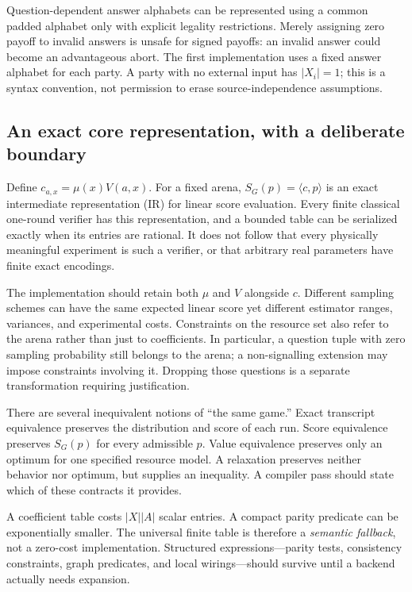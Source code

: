Question-dependent answer alphabets can be represented using a common padded
alphabet only with explicit legality restrictions. Merely assigning zero payoff
to invalid answers is unsafe for signed payoffs: an invalid answer could become
an advantageous abort. The first implementation uses a fixed answer alphabet
for each party. A party with no external input has $|X_i|=1$; this is a syntax
convention, not permission to erase source-independence assumptions.

\subsection{An exact core representation, with a deliberate boundary}
Define $c_{a,x}=\mu(x)V(a,x)$. For a fixed arena,
$S_G(p)=\langle c,p\rangle$ is an exact intermediate representation (IR) for
linear score evaluation. Every finite classical one-round verifier has this
representation, and a bounded table can be serialized exactly when its entries
are rational. It does not follow that every physically meaningful experiment
is such a verifier, or that arbitrary real parameters have finite exact
encodings.

The implementation should retain both $\mu$ and $V$ alongside $c$. Different
sampling schemes can have the same expected linear score yet different
estimator ranges, variances, and experimental costs. Constraints on the
resource set also refer to the arena rather than just to coefficients. In
particular, a question tuple with zero sampling probability still belongs to
the arena; a non-signalling extension may impose constraints involving it.
Dropping those questions is a separate transformation requiring justification.

There are several inequivalent notions of ``the same game.'' Exact transcript
equivalence preserves the distribution and score of each run. Score
equivalence preserves $S_G(p)$ for every admissible $p$. Value equivalence
preserves only an optimum for one specified resource model. A relaxation
preserves neither behavior nor optimum, but supplies an inequality. A
compiler pass should state which of these contracts it provides.

A coefficient table costs $|X||A|$ scalar entries. A compact parity predicate
can be exponentially smaller. The universal finite table is therefore a
\emph{semantic fallback}, not a zero-cost implementation. Structured
expressions---parity tests, consistency constraints, graph predicates, and
local wirings---should survive until a backend actually needs expansion.
